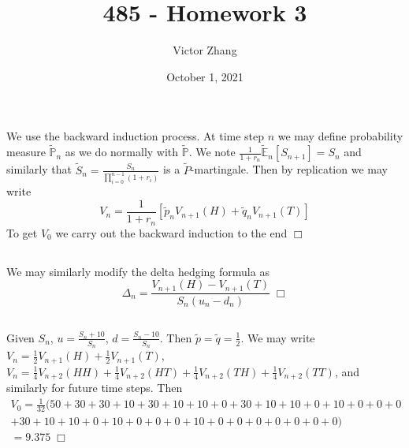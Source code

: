 \documentclass{article}
\title{485 - Homework 3}
\author{Victor Zhang}
\date{October 1, 2021}
\begin{document}
\maketitle

\section{}
\subsection{}
We use the backward induction process. At time step $n$ we may define probability measure $\widetilde{\mathbb{P}}_n$ as we do normally with $\widetilde{\mathbb{P}}$. We note $\frac{1}{1+r_n}\widetilde{\mathbb{E}}_n[S_{n+1}] = S_n$ and similarly that $\widetilde{S}_n = \frac{S_n}{\prod^{n-1}_{i=0} (1+r_i)}$ is a $\widetilde{P}$-martingale. Then by replication we may write
$$V_n = \frac{1}{1+r_n} \left[ \tilde{p}_n V_{n+1}(H) + \tilde{q}_n V_{n+1}(T) \right]$$
To get $V_0$ we carry out the backward induction to the end $\Box$

\subsection{}
We may similarly modify the delta hedging formula as
$$\Delta_n = \frac{V_{n+1}(H) - V_{n+1}(T)}{S_n(u_n - d_n)} \; \Box$$

\subsection{}
Given $S_n$, $u = \frac{S_n + 10}{S_n}$, $d = \frac{S_n - 10}{S_n}$. Then $\tilde{p} = \tilde{q} = \frac{1}{2}$. We may write $V_n = \frac{1}{2} V_{n+1}(H) + \frac{1}{2} V_{n+1}(T)$, $V_n = \frac{1}{4} V_{n+2}(HH) + \frac{1}{4} V_{n+2}(HT) + \frac{1}{4} V_{n+2}(TH) + \frac{1}{4} V_{n+2}(TT)$, and similarly for future time steps. Then
\begin{gather*}
V_0 = \frac{1}{32} ( 50 + 30 + 30 + 10 + 30 + 10 + 10 + 0 + 30 + 10 + 10 + 0 + 10 + 0 + 0 + 0\\
+ 30 + 10 + 10 + 0 + 10 + 0 + 0 + 0 + 10 + 0 + 0 + 0 + 0 + 0 + 0 + 0)\\
= 9.375 \; \Box
\end{gather*}
\end{document}
